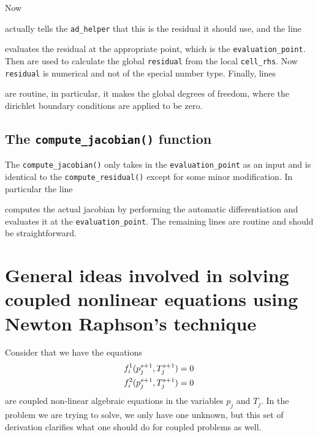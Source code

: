 \documentclass[preprint,12pt]{elsarticle}
\newcommand{\te}[1]{\lstinline{#1}}
\numberwithin{equation}{section}
\begin{document}
Now 

actually tells the \te{ad_helper} that this is the residual it should use, and the line

evaluates the residual at the appropriate point, which is the \te{evaluation_point}. Then
 are used to calculate the global \te{residual} from the local \te{cell_rhs}. Now \te{residual} is numerical and not of the special number type. Finally, lines
 
are routine, in particular, it makes the global degrees of freedom, where the dirichlet boundary conditions are applied to be zero.
\subsection{The \te{compute_jacobian()} function}
The \te{compute_jacobian()} only takes in the \te{evaluation_point} as an input and is identical to the 
\te{compute_residual()} except for some minor modification. In particular the line
 
computes the actual jacobian by performing the automatic differentiation and evaluates it at the \te{evaluation_point}. The remaining lines are routine and should be straightforward. 

\section{General ideas involved in solving coupled nonlinear equations using Newton Raphson's technique}
Consider that we have the equations 
\begin{eqnarray}
	f_i^1(p_j^{s+1}, T_j^{s+1})=0 \label{eq13}\\
	f_i^2(p_j^{s+1}, T_j^{s+1})=0 \label{eq14}
	\label{eqn}
\end{eqnarray}
are coupled non-linear algebraic equations in the variables $p_j$ and $T_j$. In the  problem we are trying to solve, we only have one unknown, but this set of derivation clarifies what one should do for coupled problems as well.
\end{document}

